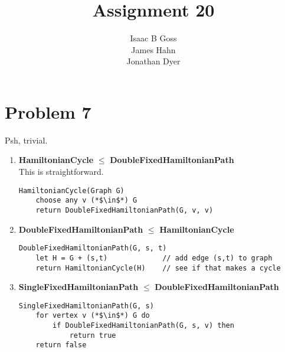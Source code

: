 \documentclass{article}
\author{Isaac B Goss\\ James Hahn\\ Jonathan Dyer}
\title{Assignment 20}
\providecommand{\prob}[1]{\section*{Problem #1}}
\providecommand{\reducible}[2]{
  \textbf{#1} $\leq$ \textbf{#2}
}
\begin{document}
\maketitle
\prob{7}
Psh, trivial.
\begin{enumerate}
  \item \reducible{HamiltonianCycle}{DoubleFixedHamiltonianPath} \\
        This is straightforward.
        \begin{lstlisting}
HamiltonianCycle(Graph G)
    choose any v (*$\in$*) G
    return DoubleFixedHamiltonianPath(G, v, v)
        \end{lstlisting}
  \item \reducible{DoubleFixedHamiltonianPath}{HamiltonianCycle} \\
        \begin{lstlisting}
DoubleFixedHamiltonianPath(G, s, t)
    let H = G + (s,t)             // add edge (s,t) to graph
    return HamiltonianCycle(H)    // see if that makes a cycle
        \end{lstlisting}
  \item \reducible{SingleFixedHamiltonianPath}{DoubleFixedHamiltonianPath} \\
        \begin{lstlisting}
SingleFixedHamiltonianPath(G, s)
    for vertex v (*$\in$*) G do
        if DoubleFixedHamiltonianPath(G, s, v) then
            return true
    return false
        \end{lstlisting}
\end{enumerate}
\end{document}
